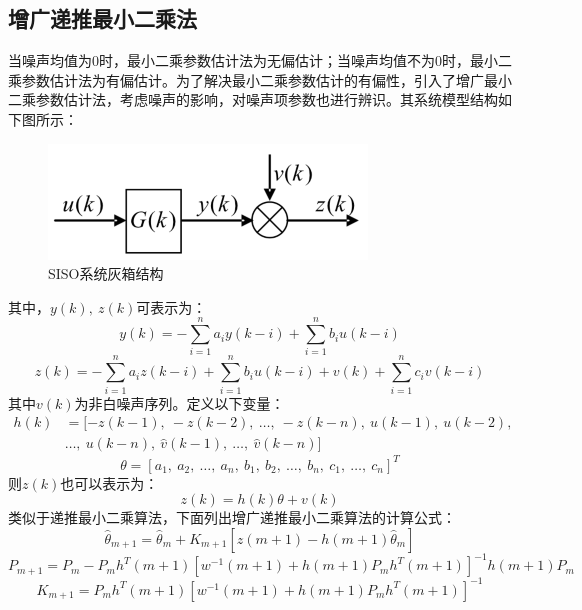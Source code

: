 \documentclass[UTF8]{article}
\begin{document}
\subsection{增广递推最小二乘法}
当噪声均值为0时，最小二乘参数估计法为无偏估计；当噪声均值不为0时，最小二乘参数估计法为有偏估计。为了解决最小二乘参数估计的有偏性，引入了增广最小二乘参数估计法，考虑噪声的影响，对噪声项参数也进行辨识。其系统模型结构如下图所示：
\begin{figure}[H]
    \centering %
    \includegraphics[width=.4\textwidth]{figure/增广最小二乘算法原理图.png} 
    \caption{SISO系统灰箱结构} %
\end{figure}
\noindent 其中，$y(k),\ z(k)$可表示为：
\begin{equation*}
    y(k) = -\sum_{i=1}^na_iy(k-i) + \sum_{i=1}^nb_iu(k-i)
\end{equation*}
\begin{equation*}
    z(k) = -\sum_{i=1}^na_iz(k-i) + \sum_{i=1}^nb_iu(k-i) + v(k) + \sum_{i=1}^nc_iv(k-i)
\end{equation*}
其中$v(k)$为非白噪声序列。定义以下变量：
\begin{align*}
    h(k) &= [-z(k-1),\ -z(k-2),\ \dots,\ -z(k-n),\ u(k-1),\ u(k-2),\ \\
    & \dots,\ u(k-n),\ \hat{v}(k-1),\ \dots,\ \hat{v}(k-n)]
\end{align*}
\begin{equation*}
    \theta = [a_1,\ a_2,\ \dots,\ a_n,\ b_1,\ b_2,\ \dots,\ b_n,\ c_1,\ \dots,\ c_n]^T
\end{equation*}
则$z(k)$也可以表示为：
\begin{equation*}
    z(k) = h(k)\theta + v(k)
\end{equation*}
类似于递推最小二乘算法，下面列出增广递推最小二乘算法的计算公式：
\begin{equation*}
    \hat{\theta}_{m+1} = \hat{\theta}_{m} + K_{m+1}[z(m+1) - h(m+1)\hat{\theta}_m]
\end{equation*}
\begin{equation*}
    P_{m+1} = P_m - P_m h^T(m+1)[w^{-1}(m+1) + h(m+1) P_m h^T(m+1)]^{-1} h(m+1) P_m
\end{equation*}
\begin{equation*}
    K_{m+1} = P_m h^T(m+1) [w^{-1}(m+1) + h(m+1) P_m h^T(m+1)]^{-1}
\end{equation*}
\end{document}
